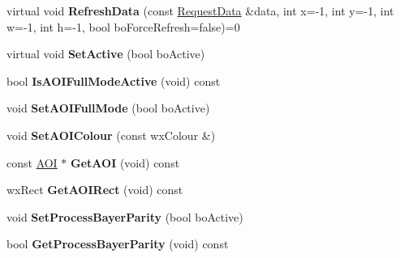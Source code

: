 \begin{DoxyCompactItemize}
\item 
\hypertarget{class_plot_canvas_image_analysis_a8965ed89c758d628de6cbefe0aabb94e}{virtual void {\bfseries Refresh\+Data} (const \hyperlink{struct_request_data}{Request\+Data} \&data, int x=-\/1, int y=-\/1, int w=-\/1, int h=-\/1, bool bo\+Force\+Refresh=false)=0}\label{class_plot_canvas_image_analysis_a8965ed89c758d628de6cbefe0aabb94e}

\item 
\hypertarget{class_plot_canvas_image_analysis_a365da242c6dcf871d425a3f0e68a692f}{virtual void {\bfseries Set\+Active} (bool bo\+Active)}\label{class_plot_canvas_image_analysis_a365da242c6dcf871d425a3f0e68a692f}

\item 
\hypertarget{class_plot_canvas_image_analysis_a3e60acd3279c019c09930e5b575ee391}{bool {\bfseries Is\+A\+O\+I\+Full\+Mode\+Active} (void) const }\label{class_plot_canvas_image_analysis_a3e60acd3279c019c09930e5b575ee391}

\item 
\hypertarget{class_plot_canvas_image_analysis_a68289ab262c35f5a928bee3186ac1d9c}{void {\bfseries Set\+A\+O\+I\+Full\+Mode} (bool bo\+Active)}\label{class_plot_canvas_image_analysis_a68289ab262c35f5a928bee3186ac1d9c}

\item 
\hypertarget{class_plot_canvas_image_analysis_a14b80bf0232916e2ddb373f8b9d66930}{void {\bfseries Set\+A\+O\+I\+Colour} (const wx\+Colour \&)}\label{class_plot_canvas_image_analysis_a14b80bf0232916e2ddb373f8b9d66930}

\item 
\hypertarget{class_plot_canvas_image_analysis_af142fe0d8065b51760bd4aca4ee7ab4e}{const \hyperlink{struct_a_o_i}{A\+O\+I} $\ast$ {\bfseries Get\+A\+O\+I} (void) const }\label{class_plot_canvas_image_analysis_af142fe0d8065b51760bd4aca4ee7ab4e}

\item 
\hypertarget{class_plot_canvas_image_analysis_a37e4e7f26972deb9d6644ce4b51b71a3}{wx\+Rect {\bfseries Get\+A\+O\+I\+Rect} (void) const }\label{class_plot_canvas_image_analysis_a37e4e7f26972deb9d6644ce4b51b71a3}

\item 
\hypertarget{class_plot_canvas_image_analysis_a12d68489bfa8764b20b4216ca0bbc1dd}{void {\bfseries Set\+Process\+Bayer\+Parity} (bool bo\+Active)}\label{class_plot_canvas_image_analysis_a12d68489bfa8764b20b4216ca0bbc1dd}

\item 
\hypertarget{class_plot_canvas_image_analysis_ad686ffe6ac959ff5d8c2cd944c26b5fb}{bool {\bfseries Get\+Process\+Bayer\+Parity} (void) const }\label{class_plot_canvas_image_analysis_ad686ffe6ac959ff5d8c2cd944c26b5fb}


\end{DoxyCompactItemize}
